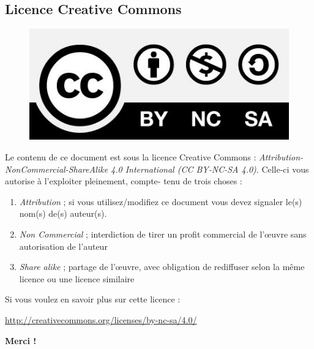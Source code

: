 \subsection*{Licence Creative Commons}
\begin{figure}
\includegraphics[scale=0.17]{CC}
\end{figure}
Le contenu de ce document est sous la licence Creative Commons : \textit{Attribution-NonCommercial-ShareAlike 
4.0 International (CC BY-NC-SA 4.0)}. Celle-ci vous autorise à l'exploiter pleinement, compte-
tenu de trois choses :
\begin{enumerate}
\item \textit{Attribution} ; si vous utilisez/modifiez ce document vous devez signaler le(s) nom(s)
de(s) auteur(s).
\item \textit{Non Commercial} ; interdiction de tirer un profit commercial de l’œuvre sans 
autorisation de l'auteur 
\item \textit{Share alike} ;  partage de l’œuvre, avec obligation de rediffuser selon la même 
licence ou une licence similaire
\end{enumerate}
Si vous voulez en savoir plus sur cette licence :
\begin{center}
\url{http://creativecommons.org/licenses/by-nc-sa/4.0/}
\end{center}

\begin{flushright}
\textbf{Merci ! }
\end{flushright}